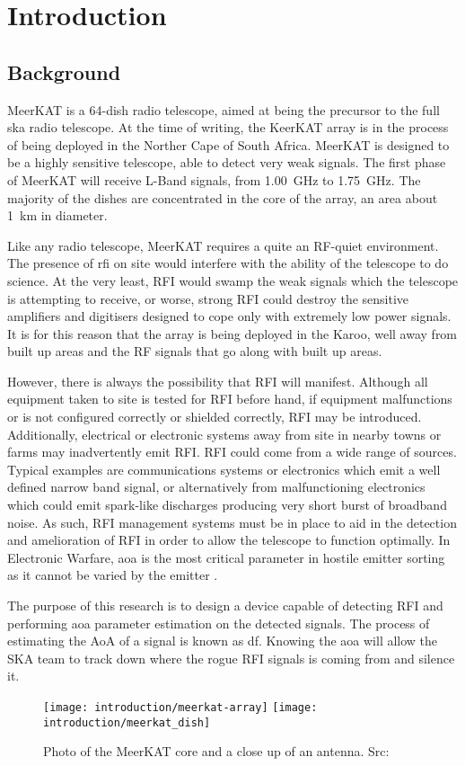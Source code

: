 \chapter{Introduction}
\label{ch:introduction}
\section{Background}
MeerKAT is a 64-dish radio telescope, aimed at being the precursor to the full \gls{ska} radio telescope. At the time of writing, the KeerKAT array is in the process of being deployed in the Norther Cape of South Africa.
MeerKAT is designed to be a highly sensitive telescope, able to detect very weak signals. The first phase of MeerKAT will receive L-Band signals, from \SI{1.00}{\giga\hertz} to \SI{1.75}{\giga\hertz}. The majority of the dishes are concentrated in the core of the array, an area about \SI{1}{\kilo\meter} in diameter.

Like any radio telescope, MeerKAT requires a quite an RF-quiet environment.
The presence of \gls{rfi} on site would interfere with the ability of the telescope to do science. At the very least, RFI would swamp the weak signals which the telescope is attempting to receive, or  worse, strong RFI could destroy the sensitive amplifiers and digitisers designed to cope only with extremely low power signals.
It is for this reason that the array is being deployed in the Karoo, well away from built up areas and the RF signals that go along with built up areas. 

However, there is always the possibility that RFI will manifest. 
Although all equipment taken to site is tested for RFI before hand, if equipment malfunctions or is not configured correctly or shielded correctly, RFI may be introduced. Additionally, electrical or electronic systems away from site in nearby towns or farms may inadvertently emit RFI. RFI could come from a wide range of sources. Typical examples are communications systems or electronics which emit a well defined narrow band signal, or alternatively from malfunctioning electronics which could emit spark-like discharges producing very short burst of broadband noise.
As such, RFI management systems must be in place to aid in the detection and amelioration of RFI in order to allow the telescope to function optimally. In Electronic Warfare, \gls{aoa} is the most critical parameter in hostile emitter sorting as it cannot be varied by the emitter \cite{center2012electronic}.

The purpose of this research is to design a device capable of detecting RFI and performing \gls{aoa} parameter estimation on the detected signals.
The process of estimating the AoA of a signal is known as \gls{df}.
Knowing the \gls{aoa} will allow the SKA team to track down where the rogue RFI signals is coming from and silence it.

\begin{figure}[hb]
  \centering
  \texttt{[image: introduction/meerkat-array]}
  \texttt{[image: introduction/meerkat\_dish]}
  \caption{Photo of the MeerKAT core and a close up of an antenna. Src: \cite{skasawebsite}}
\end{figure}



